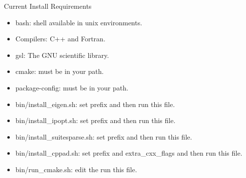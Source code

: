 \documentclass{beamer}
\begin{document}
\begin{frame}{Current Install Requirements}

\begin{itemize}

\item
bash: shell available in unix environments.
\pause

\item
Compilers: C++ and Fortran.
\pause

\item
gsl: The GNU scientific library.
\pause

\item
cmake: must be in your path.
\pause

\item
package-config: must be in your path.
\pause

\item
bin/install\_eigen.sh: set prefix and then run this file.
\pause

\item
bin/install\_ipopt.sh: set prefix and then run this file.
\pause

\item
bin/install\_suitesparse.sh: set prefix and then run this file.
\pause

\item
bin/install\_cppad.sh: set prefix and extra\_cxx\_flags and then run this file.
\pause

\item
bin/run\_cmake.sh: edit the run this file.
\pause

\end{itemize}
\end{frame}
\end{document}

